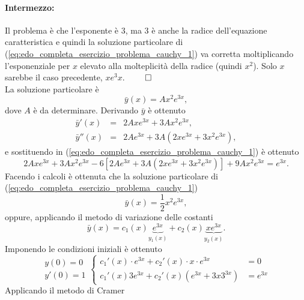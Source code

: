 \begin{example}
	\paragraph{Intermezzo:} Il problema è che l'esponente è 3, ma 3 è anche la radice dell'equazione caratteristica e quindi la soluzione particolare di (\ref{eq:edo_completa_esercizio_problema_cauchy_1}) va corretta moltiplicando l'esponenziale per $x$ elevato alla molteplicità della radice (quindi $x^2$). Solo $x$ sarebbe il caso precedente, $x e^3x$. $\qed$\\
	La soluzione particolare è 
	\begin{equation*}
		\bar y(x)=Ax^2e^{3x},
	\end{equation*}
	dove $A$ è da determinare. Derivando $\bar{y}$ è ottenuto
	\begin{equation*}
		\begin{matrix}
			\bar y'(x) &=& 2Axe^{3x} + 3A x^2 e^{3x},\\
			\bar y''(x) &=& 2Ae^{3x} + 3A(2xe^{3x} + 3x^2e^{3x}),
		\end{matrix}
	\end{equation*}
	e sostituendo in (\ref{eq:edo_completa_esercizio_problema_cauchy_1}) è ottenuto
	\begin{equation*}
		2Axe^{3x} + 3A x^2 e^{3x} - 6 [2Ae^{3x} + 3A(2xe^{3x} + 3x^2e^{3x})] + 9 Ax^2e^{3x} =  e^{3x}.
	\end{equation*}
	Facendo i calcoli è ottenuta che la soluzione particolare di (\ref{eq:edo_completa_esercizio_problema_cauchy_1})
	\begin{equation*}
		\bar y(x) =\frac{1}{2} x^2 e^{3x},
	\end{equation*}
	oppure, applicando il metodo di variazione delle costanti
	\begin{equation*}
		\bar y(x) = c_1(x) \underbrace{e^{3x}}_{y_1(x)} + c_2(x) \underbrace{x e^{3x}}_{y_2(x)}.
	\end{equation*}
	Imponendo le condizioni iniziali è ottenuto
	\begin{equation*}
		\begin{matrix}
			y(0)=0\\
			y'(0)=1
		\end{matrix}
		\begin{cases}
			c_1'(x) \cdot e^{3x} + c_2'(x)\cdot x\cdot e^{3x} &=0\\
			c_1'(x) 3 e^{3x} + c_2'(x) (e^{3x} + 3x3^{3x}) &= e^{3x}
		\end{cases}
	\end{equation*}
	Applicando il metodo di Cramer

\end{example}
